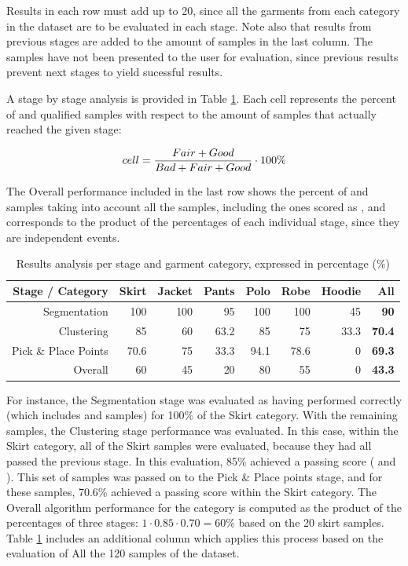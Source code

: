 Results in each row must add up to 20, since all the garments from each category in the dataset are to be evaluated in each stage. Note also that \fail{} results from previous stages are added to the amount of \discarded{} samples in the last column. The \discarded{} samples have not been presented to the user for evaluation, since previous \fail{} results prevent next stages to yield sucessful results.

A stage by stage analysis is provided in Table \ref{table:table2}. Each cell represents the percent of \good{} and \great{} qualified samples with respect to the amount of samples that actually reached the given stage:

\begin{equation}
cell = \frac{Fair + Good}{Bad + Fair + Good} \cdot 100 \%
\end{equation}

The Overall performance included in the last row shows the percent of \good{} and \great{} samples taking into account all the samples, including the ones scored as \discarded{}, and corresponds to the product of the percentages of each individual stage, since they are independent events.

\begin{table}[htbp]
\centering
\begin{tabular}{|r||r|r|r|r|r|r||r|}
\hline
	Stage \slash{} Category & Skirt & Jacket & Pants & Polo & Robe & Hoodie & All \\
\hline\hline
   Segmentation         & 100   & 100 &  95   & 100   & 100   & 45   & \textbf{90}\\
   Clustering           &  85   &  60 &  63.2 &  85   &  75   & 33.3 & \textbf{70.4}\\
   Pick \& Place Points &  70.6 &  75 &  33.3 &  94.1 &  78.6 &  0   & \textbf{69.3}\\
   \hline\hline
   Overall              &  60   &  45 &  20   &  80   &    55 &  0   & \textbf{43.3} \\ 
\hline
\end{tabular}
\caption{Results analysis per stage and garment category, expressed in percentage (\%)}
\label{table:table2}
\end{table}

For instance, the Segmentation stage was evaluated as having performed correctly (which includes \good{} and \great{} samples) for 100\% of the Skirt category. With the remaining samples, the Clustering stage performance was evaluated. In this case, within the Skirt category, all of the Skirt samples were evaluated, because they had all passed the previous stage. In this evaluation, 85\% achieved a passing score (\good{} and \great{}). This set of samples was passed on to the Pick \& Place points stage, and for these samples, 70.6\% achieved a passing score within the Skirt category. The Overall algorithm performance for the category is computed as the product of the percentages of three stages: $1 \cdot 0.85 \cdot 0.70 = 60\%$ based on the 20 skirt samples. Table \ref{table:table2} includes an additional column which applies this process based on the evaluation of All the 120 samples of the dataset.


